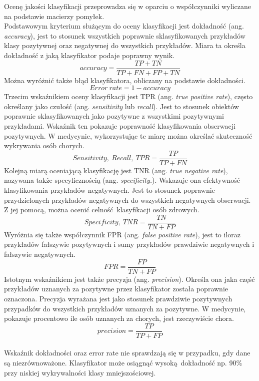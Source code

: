 Ocenę jakości klasyfikacji przeprowadza się w oparciu o współczynniki wyliczane na podstawie macierzy pomyłek.\\
Podstawowym kryterium służącym do oceny klasyfikacji jest dokładność (ang. \textit{accuracy}), jest to stosunek wszystkich poprawnie sklasyfikowanych przykładów klasy pozytywnej oraz negatywnej do wszystkich przykładów. Miara ta określa dokładność z jaką klasyfikator podaje poprawny wynik.
\[accuracy = \frac{TP + TN}{TP + FN + FP + TN}\]
Można wyróżnić także błąd klasyfikatora, obliczany na podstawie dokładności.
\[Error\ rate = 1 - accuracy\label{error_rate}\]
Trzecim wskaźnikiem oceny klasyfikacji jest TPR (ang. \textit{true positive rate}), często określany jako czułość (ang. \textit{sensitivity} lub \textit{recall}). Jest to stosunek obiektów poprawnie sklasyfikowanych jako pozytywne z wszystkimi pozytywnymi przykładami. Wskaźnik ten pokazuje poprawność klasyfikowania obserwacji pozytywnych. W medycynie, wykorzystując te miarę można określać skuteczność wykrywania osób chorych.
\[Sensitivity,\ Recall,\ TPR = \frac{TP}{TP + FN}\]
Kolejną miarą oceniającą klasyfikację jest TNR (ang. \textit{true negative rate}), nazywana także specyficznością (ang. \textit{specificity.}). Wskazuje ona efektywność klasyfikowania przykładów negatywnych. Jest to stosunek poprawnie przydzielonych przykładów negatywnych do wszystkich negatywnych obserwacji. Z jej pomocą, można ocenić celność klasyfikacji osób zdrowych.
\[Specificity,\ TNR = \frac{TN}{TN + FP}\]
Wyróżnia się także współczynnik FPR (ang. \textit{false positive rate}), jest to iloraz przykładów fałszywie pozytywnych i sumy przykładów prawdziwie negatywnych i fałszywie negatywnych.
\[FPR = \frac{FP}{TN + FP}\]
Istotnym wskaźnikiem jest także precyzja (ang. \textit{precision}). Określa ona jaka część przykładów uznanych za pozytywne przez klasyfikator została poprawnie oznaczona. Precyzja wyrażana jest jako stosunek prawdziwie pozytywnych przypadków do wszystkich przykładów uznanych za pozytywne. W medycynie, pokazuje procentowo ile osób uznanych za chorych, jest rzeczywiście chora.
\[precision = \frac{TP}{TP + FP}\]\\
Wskaźnik dokładności oraz error rate nie sprawdzają się w przypadku, gdy dane są niezrównoważone. Klasyfikator może osiągnąć wysoką dokładność np. 90\% przy niskiej wykrywalności klasy mniejszościowej.
